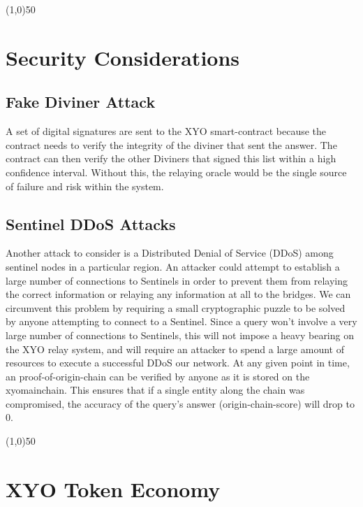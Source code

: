 \documentclass{article}
\begin{document}
\begin{center}
\line(1,0){50}
\end{center}

\section{Security Considerations}

\subsection{Fake Diviner Attack}

A set of digital signatures are sent to the XYO \gls{smart-contract} because the contract needs to verify the integrity of the \Gls{diviner} that sent the answer. The contract can then verify the other Diviners that signed this list within a high confidence interval. Without this, the relaying oracle would be the single source of failure and risk within the system.

\subsection{Sentinel DDoS Attacks}

Another attack to consider is a Distributed Denial of Service (DDoS) among \Gls{sentinel} nodes in a particular region. An attacker could attempt to establish a large number of connections to Sentinels in order to prevent them from relaying the correct information or relaying any information at all to the \Glspl{bridge}. We can circumvent this problem by requiring a small cryptographic puzzle to be solved by anyone attempting to connect to a Sentinel. Since a query won't involve a very large number of connections to Sentinels, this will not impose a heavy bearing on the XYO relay system, and will require an attacker to spend a large amount of resources to execute a successful DDoS our network. At any given point in time, an \Gls{proof-of-origin-chain} can be verified by anyone as it is stored on the \Gls{xyomainchain}. This ensures that if a single entity along the chain was compromised, the accuracy of the query's answer (\Gls{origin-chain-score}) will drop to 0.

\begin{center}
\line(1,0){50}
\end{center}

\section {XYO Token Economy}
\end{document}
